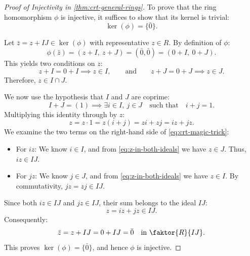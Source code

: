 \begin{content}
\begin{proof}[Proof of Injectivity in \cref{thm:crt-general-rings}]
To prove that the ring homomorphism $\phi$ is injective, it suffices to show that its kernel is trivial:
\[
\ker(\phi) = \{ \bar{0} \}.
\]

Let $\bar{z} = z + IJ \in \ker(\phi)$ with representative $z \in R$.
By definition of $\phi$:
\[
\phi(\bar{z}) = (z + I, \ z + J) = (\bar{0}, \bar{0}) = (0 + I, \ 0 + J).
\]
This yields two conditions on $z$:
\begin{equation}\label{eq:z-in-both-ideals}
z + I = 0 + I \implies z \in I, \qquad \text{and} \qquad z + J = 0 + J \implies z \in J.
\end{equation}
Therefore, $z \in I \cap J$.

We now use the hypothesis that $I$ and $J$ are coprime:
\[
I + J = (1) \implies \exists i \in I, \ j \in J \quad \text{such that} \quad i + j = 1.
\]
Multiplying this identity through by $z$:
\begin{equation}\label{eq:crt-magic-trick}
z = z \cdot 1 = z(i + j) = z i + z j = i z + j z.
\end{equation}
We examine the two terms on the right-hand side of \eqref{eq:crt-magic-trick}:
\begin{itemize}
    \item For $i z$: We know $i \in I$, and from \eqref{eq:z-in-both-ideals} we have $z \in J$. Thus, $i z \in I J$.
    \item For $j z$: We know $j \in J$, and from \eqref{eq:z-in-both-ideals} we have $z \in I$. By commutativity, $j z = z j \in I J$.
\end{itemize}
Since both $i z \in I J$ and $j z \in I J$, their sum belongs to the ideal $I J$:
\[
z = i z + j z \in I J.
\]
Consequently:
\[
\bar{z} = z + IJ = 0 + IJ = \bar{0} \quad \text{in } \faktor{R}{IJ}.
\]
This proves $\ker(\phi) = \{ \bar{0} \}$, and hence $\phi$ is injective.
\end{proof}


\end{content}
